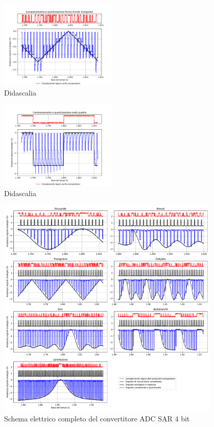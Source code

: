 \documentclass[journal]{IEEEtran}
\begin{document}
\begin{figure}[H]%
\begin{center}
\includegraphics[trim = {0 25 0 0},clip, width=0.50\textwidth]{analysis/output/triangle_wave_aq.pdf}
\caption{Didascalia}
\label{fig:circuit_DAC}
\end{center}
\end{figure}

\begin{figure}[H]%
\begin{center}
\includegraphics[trim = {0 25 0 0},clip, width=0.50\textwidth]{analysis/output/square_wave_aq.pdf}
\caption{Didascalia}
\label{fig:circuit_DAC}
\end{center}
\end{figure}

\begin{figure}[t]%
\centering
\includegraphics[trim = {30 0 50 0}, width=0.95\textwidth]{analysis/output/waveforms.pdf}
\caption{Schema elettrico completo del convertitore ADC SAR 4 bit}
\label{fig:waveforms_no_sh_scope}
\end{figure}
\end{document}
